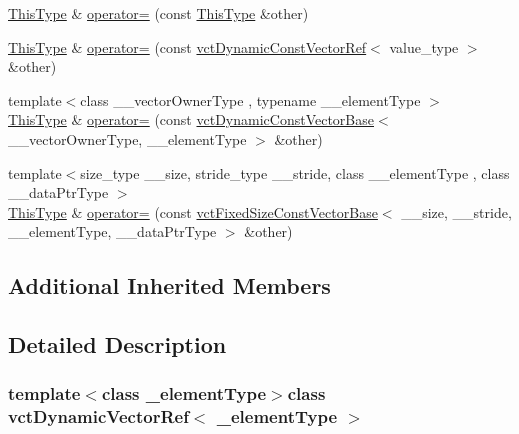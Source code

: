 {\bf }\par
\begin{DoxyCompactItemize}
\item 
\hyperlink{classvct_dynamic_vector_ref_adde8a247e72c476120c26cfa15a37c6d}{This\-Type} \& \hyperlink{classvct_dynamic_vector_ref_a10c6fd35bc208ca4455acf12fb4756bc}{operator=} (const \hyperlink{classvct_dynamic_vector_ref_adde8a247e72c476120c26cfa15a37c6d}{This\-Type} \&other)
\item 
\hyperlink{classvct_dynamic_vector_ref_adde8a247e72c476120c26cfa15a37c6d}{This\-Type} \& \hyperlink{classvct_dynamic_vector_ref_a872f9fd05b36fe0c1a8e47ff32b77549}{operator=} (const \hyperlink{classvct_dynamic_const_vector_ref}{vct\-Dynamic\-Const\-Vector\-Ref}$<$ value\-\_\-type $>$ \&other)
\item 
{\footnotesize template$<$class \-\_\-\-\_\-vector\-Owner\-Type , typename \-\_\-\-\_\-element\-Type $>$ }\\\hyperlink{classvct_dynamic_vector_ref_adde8a247e72c476120c26cfa15a37c6d}{This\-Type} \& \hyperlink{classvct_dynamic_vector_ref_aa5c2a82b9270f763f5ab49ef8b51d113}{operator=} (const \hyperlink{classvct_dynamic_const_vector_base}{vct\-Dynamic\-Const\-Vector\-Base}$<$ \-\_\-\-\_\-vector\-Owner\-Type, \-\_\-\-\_\-element\-Type $>$ \&other)
\item 
{\footnotesize template$<$size\-\_\-type \-\_\-\-\_\-size, stride\-\_\-type \-\_\-\-\_\-stride, class \-\_\-\-\_\-element\-Type , class \-\_\-\-\_\-data\-Ptr\-Type $>$ }\\\hyperlink{classvct_dynamic_vector_ref_adde8a247e72c476120c26cfa15a37c6d}{This\-Type} \& \hyperlink{classvct_dynamic_vector_ref_ac4e4b98feb480a6cd1a42eeb4064b66f}{operator=} (const \hyperlink{classvct_fixed_size_const_vector_base}{vct\-Fixed\-Size\-Const\-Vector\-Base}$<$ \-\_\-\-\_\-size, \-\_\-\-\_\-stride, \-\_\-\-\_\-element\-Type, \-\_\-\-\_\-data\-Ptr\-Type $>$ \&other)
\end{DoxyCompactItemize}

\subsection*{Additional Inherited Members}


\subsection{Detailed Description}
\subsubsection*{template$<$class \-\_\-element\-Type$>$class vct\-Dynamic\-Vector\-Ref$<$ \-\_\-element\-Type $>$}

